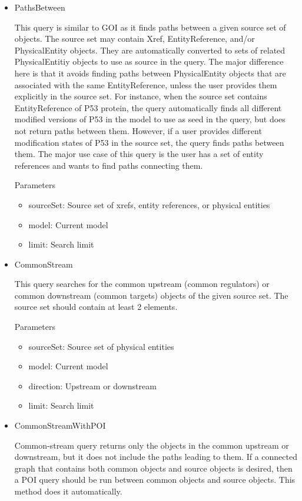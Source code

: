 \documentclass{tufte-book}
\begin{document}
\begin{itemize}
\item PathsBetween 

This query is similar to GOI as it finds paths between a given source set of objects. The source set may contain Xref, EntityReference, and/or PhysicalEntity objects. They are automatically converted to sets of related PhysicalEntitiy objects to use as source in the query. The major difference here is that it avoids finding paths between PhysicalEntity objects that are associated with the same EntityReference, unless the user provides them explicitly in the source set. For instance, when the source set contains EntityReference of P53 protein, the query automatically finds all different modified versions of P53 in the model to use as seed in the query, but does not return paths between them. However, if a user provides different modification states of P53 in the source set, the query finds paths between them. The major use case of this query is the user has a set of entity references and wants to find paths connecting them.

Parameters

\begin{itemize}
\item sourceSet: Source set of xrefs, entity references, or physical entities
\item model: Current model
\item limit: Search limit
\end{itemize}


\item CommonStream

This query searches for the common upstream (common regulators) or common downstream (common targets) objects of the given source set. The source set should contain at least 2 elements.

Parameters

\begin{itemize}
\item sourceSet: Source set of physical entities
\item model: Current model
\item direction: Upstream or downstream
\item limit: Search limit
\end{itemize}


\item CommonStreamWithPOI

Common-stream query returns only the objects in the common upstream or downstream, but it does not include the paths leading to them. If a connected graph that contains both common objects and source objects is desired, then a POI query should be run between common objects and source objects. This method does it automatically.


\end{itemize}
\end{document}
